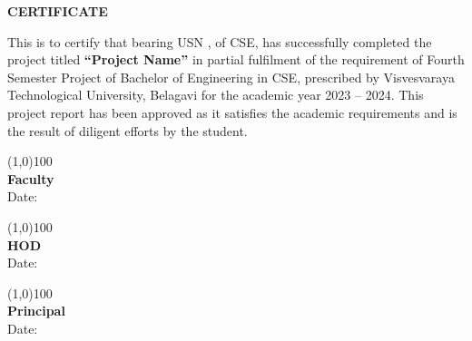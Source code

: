 \documentclass[a4paper,12pt]{article}
\begin{document}
	
	\begin{center}
		\LARGE \textbf{CERTIFICATE}
	\end{center}
	
	\vspace{2cm}
	
	\large \noindent \hspace{1cm} This is to certify that \underline{\hspace{4cm}} bearing USN \underline{\hspace{3cm}}, of CSE, has successfully completed the project titled \textbf{“Project Name”} in partial fulfilment of the requirement of Fourth Semester Project of Bachelor of Engineering in CSE, prescribed by Visvesvaraya Technological University, Belagavi for the academic year 2023 – 2024. This project report has been approved as it satisfies the academic requirements and is the result of diligent efforts by the student. \\[2cm]
	
	\vspace{5.5cm}
	\noindent
	\begin{minipage}{5cm}
		\begin{flushleft}
			\vspace{3cm}
			\line(1,0){100}\\
			\textbf{Faculty}\\
			Date:
		\end{flushleft}
	\end{minipage}
	\hspace{1.5cm}
	\begin{minipage}{5cm}
		\begin{flushleft}
			\vspace{3cm}
			\line(1,0){100}\\
			\textbf{HOD}\\
			Date:
		\end{flushleft}
	\end{minipage}
	\hspace{1.5cm}
	\begin{minipage}{5cm}
		\begin{flushleft}
			\vspace{3cm}
			\line(1,0){100}\\
			\textbf{Principal}\\
			Date:
		\end{flushleft}
	\end{minipage}
	
\end{document}
